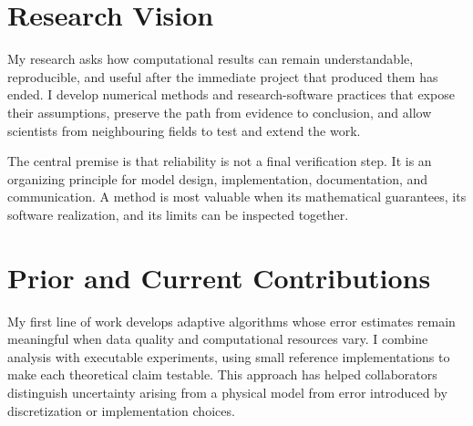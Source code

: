 \documentclass[type=research, medium=print]{careerdossier-statement}
\begin{document}
\MakeCDossierStatementHeader

\section*{Research Vision}

My research asks how computational results can remain understandable,
reproducible, and useful after the immediate project that produced them has
ended. I develop numerical methods and research-software practices that expose
their assumptions, preserve the path from evidence to conclusion, and allow
scientists from neighbouring fields to test and extend the work.

The central premise is that reliability is not a final verification step. It is
an organizing principle for model design, implementation, documentation, and
communication. A method is most valuable when its mathematical guarantees, its
software realization, and its limits can be inspected together.

\section*{Prior and Current Contributions}


My first line of work develops adaptive algorithms whose error estimates remain
meaningful when data quality and computational resources vary. I combine
analysis with executable experiments, using small reference implementations to
make each theoretical claim testable. This approach has helped collaborators
distinguish uncertainty arising from a physical model from error introduced by
discretization or implementation choices.

\end{document}
